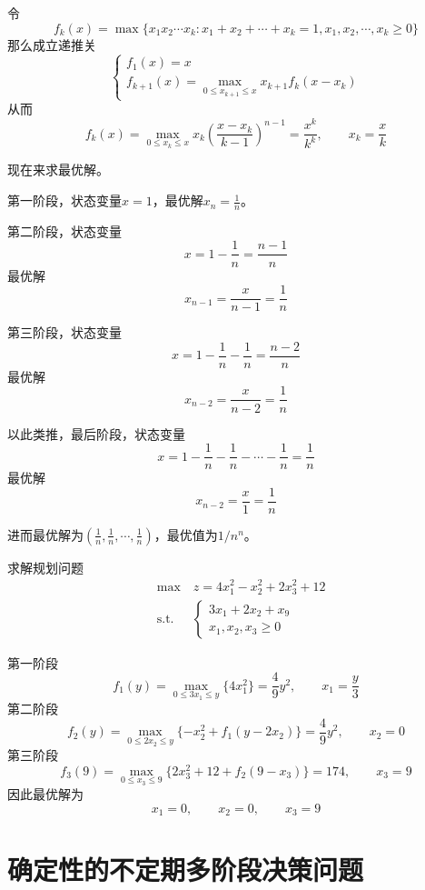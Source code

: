 \documentclass[lang = cn, scheme = chinese, thmcnt = section]{elegantbook}
\newcommand{\dis}{\displaystyle}
\begin{document}
\begin{solution}
	令%
	$$
	f_k(x)=\max\{ x_1x_2\cdots x_k:x_1+x_2+\cdots+x_k=1,x_1,x_2,\cdots,x_k\ge 0 \}
	$$
	那么成立递推关%
	$$
	\begin{cases}
		f_1(x)=x\\
		\dis f_{k+1}(x)=\max_{0\le x_{k+1}\le x}x_{k+1}f_{k}(x-x_k)
	\end{cases}
	$$
	从而%
	$$
	f_k(x)=\max_{0\le x_k \le x}x_k\left(\frac{x-x_k}{k-1}\right)^{n-1}=\frac{x^k}{k^k},\qquad x_k=\frac{x}{k}
	$$
	
	现在来求最优解。
	
	第一阶段，状态变量$x=1$，最优解$x_n=\frac{1}{n}$。
	
	第二阶段，状态变量%
	$$
	x=1-\frac{1}{n}=\frac{n-1}{n}
	$$
	最优解%
	$$
	x_{n-1}=\frac{x}{n-1}=\frac{1}{n}
	$$
	
	第三阶段，状态变量%
	$$
	x=1-\frac{1}{n}-\frac{1}{n}=\frac{n-2}{n}
	$$
	最优解%
	$$
	x_{n-2}=\frac{x}{n-2}=\frac{1}{n}
	$$
	
	以此类推，最后阶段，状态变量%
	$$
	x=1-\frac{1}{n}-\frac{1}{n}-\cdots-\frac{1}{n}=\frac{1}{n}
	$$
	最优解%
	$$
	x_{n-2}=\frac{x}{1}=\frac{1}{n}
	$$
	
	进而最优解为$\left(\frac{1}{n},\frac{1}{n},\cdots,\frac{1}{n}\right)$，最优值为$1/n^n$。
\end{solution}

\begin{example}
	求解规划问题
	\begin{align*}
		& \text{max}  \quad z=4x_1^2-x_2^2+2x_3^2+12\\
		& \text{s.t.} \;\, \quad \begin{cases}
			3x_1+2x_2+x_9\\
			x_1,x_2,x_3\ge 0
		\end{cases}
	\end{align*}
\end{example}

\begin{solution}
	第一阶段%
	$$
	f_1(y)=\max_{0\le 3 x_1\le y}\{ 4x_1^2 \}=\frac{4}{9}y^2,\qquad x_1=\frac{y}{3}
	$$
	第二阶段%
	$$
	f_2(y)=\max_{0\le 2x_2\le y}\{ -x_2^2+f_1(y-2x_2) \}
	=\frac{4}{9}y^2,\qquad x_2=0
	$$
	第三阶段%
	$$
	f_3(9)=\max_{0\le x_3\le 9}\{ 2x_3^2+12+f_2(9-x_3) \}
	=174,\qquad x_3=9
	$$
	因此最优解为%
	$$
	x_1=0,\qquad
	x_2=0,\qquad
	x_3=9
	$$
\end{solution}

\section{确定性的不定期多阶段决策问题}
\end{document}
